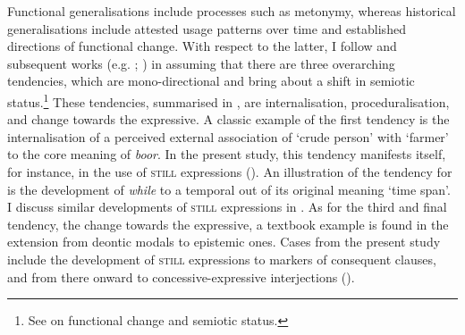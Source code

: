 Functional generalisations include processes such as metonymy, whereas historical generalisations include attested usage patterns over time and established directions of functional change. With respect to the latter, I follow \textcite{Traugott1989} and subsequent works (e.g. \cite{Traugott1999}; \cite{TraugottDasher2002}) in assuming that there are three overarching tendencies, which are mono-directional and bring about a shift in semiotic status.\footnote{See \textcite{Diewald2011} on functional change and semiotic status.} These tendencies, summarised in , are internalisation, proceduralisation, and change towards the expressive. A classic example of the first tendency is the internalisation of a perceived external association of \lq crude person\rq{ }with \lq farmer\rq{ }to the core meaning of  \textit{boor}. In the present study, this tendency manifests itself, for instance, in the  use of \textsc{still} expressions (). An illustration of the tendency for  is the development of  \textit{while} to a temporal  out of its original meaning \lq time span\rq{}. I discuss similar developments of \textsc{still} expressions in . As for the third and final tendency, the change towards the expressive, a textbook example is found in the extension from deontic modals to epistemic ones. Cases from the present study include the development of \textsc{still} expressions to markers of  consequent clauses, and from there onward to concessive-expressive interjections ().

